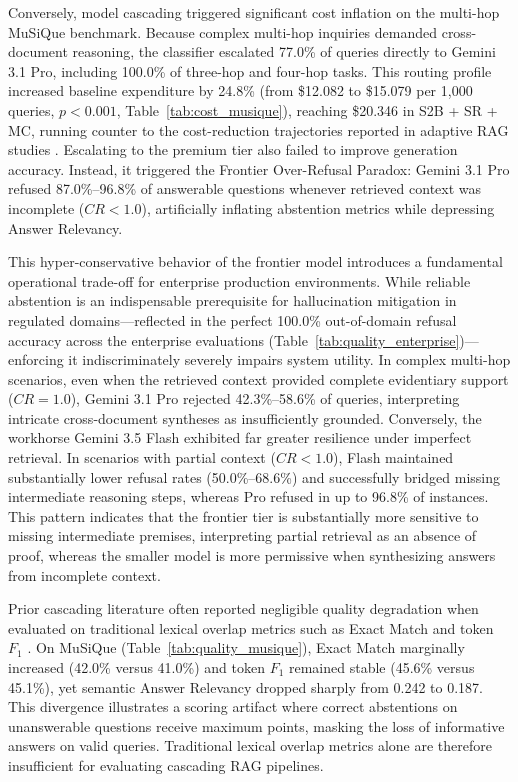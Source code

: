 Conversely, model cascading triggered significant cost inflation on the multi-hop MuSiQue benchmark. Because complex multi-hop inquiries demanded cross-document reasoning, the classifier escalated 77.0\% of queries directly to Gemini 3.1 Pro, including 100.0\% of three-hop and four-hop tasks. This routing profile increased baseline expenditure by 24.8\% (from \$12.082 to \$15.079 per 1,000 queries, $p < 0.001$, Table~\ref{tab:cost_musique}), reaching \$20.346 in S2B + SR + MC, running counter to the cost-reduction trajectories reported in adaptive RAG studies \citep{jeong2024adaptive, guo2026deepsieve}. Escalating to the premium tier also failed to improve generation accuracy. Instead, it triggered the Frontier Over-Refusal Paradox: Gemini 3.1 Pro refused 87.0\%--96.8\% of answerable questions whenever retrieved context was incomplete ($CR < 1.0$), artificially inflating abstention metrics while depressing Answer Relevancy.

This hyper-conservative behavior of the frontier model introduces a fundamental operational trade-off for enterprise production environments. While reliable abstention is an indispensable prerequisite for hallucination mitigation in regulated domains---reflected in the perfect 100.0\% out-of-domain refusal accuracy across the enterprise evaluations (Table~\ref{tab:quality_enterprise})---enforcing it indiscriminately severely impairs system utility. In complex multi-hop scenarios, even when the retrieved context provided complete evidentiary support ($CR = 1.0$), Gemini 3.1 Pro rejected 42.3\%--58.6\% of queries, interpreting intricate cross-document syntheses as insufficiently grounded. Conversely, the workhorse Gemini 3.5 Flash exhibited far greater resilience under imperfect retrieval. In scenarios with partial context ($CR < 1.0$), Flash maintained substantially lower refusal rates (50.0\%--68.6\%) and successfully bridged missing intermediate reasoning steps, whereas Pro refused in up to 96.8\% of instances. This pattern indicates that the frontier tier is substantially more sensitive to missing intermediate premises, interpreting partial retrieval as an absence of proof, whereas the smaller model is more permissive when synthesizing answers from incomplete context.

Prior cascading literature often reported negligible quality degradation when evaluated on traditional lexical overlap metrics such as Exact Match and token $F_1$ \citep{jeong2024adaptive, guo2026deepsieve}. On MuSiQue (Table~\ref{tab:quality_musique}), Exact Match marginally increased (42.0\% versus 41.0\%) and token $F_1$ remained stable (45.6\% versus 45.1\%), yet semantic Answer Relevancy dropped sharply from 0.242 to 0.187. This divergence illustrates a scoring artifact where correct abstentions on unanswerable questions receive maximum points, masking the loss of informative answers on valid queries. Traditional lexical overlap metrics alone are therefore insufficient for evaluating cascading RAG pipelines.

